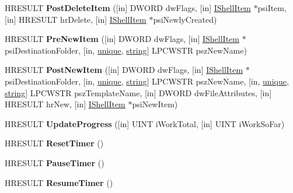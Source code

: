 \begin{DoxyCompactItemize}
\mbox{\label{interface_i_file_operation_progress_sink_a0ae276783b42d07e7987d2aa11f25bc9}} 
H\+R\+E\+S\+U\+LT {\bfseries Post\+Delete\+Item} (\mbox{[}in\mbox{]} D\+W\+O\+RD dw\+Flags, \mbox{[}in\mbox{]} \hyperlink{interface_i_shell_item}{I\+Shell\+Item} $\ast$psi\+Item, \mbox{[}in\mbox{]} H\+R\+E\+S\+U\+LT hr\+Delete, \mbox{[}in\mbox{]} \hyperlink{interface_i_shell_item}{I\+Shell\+Item} $\ast$psi\+Newly\+Created)
\item 
\mbox{\label{interface_i_file_operation_progress_sink_ac50b06e09f12c69331bfff394da7db4e}} 
H\+R\+E\+S\+U\+LT {\bfseries Pre\+New\+Item} (\mbox{[}in\mbox{]} D\+W\+O\+RD dw\+Flags, \mbox{[}in\mbox{]} \hyperlink{interface_i_shell_item}{I\+Shell\+Item} $\ast$psi\+Destination\+Folder, \mbox{[}in, \hyperlink{interfaceunique}{unique}, \hyperlink{structstring}{string}\mbox{]} L\+P\+C\+W\+S\+TR psz\+New\+Name)
\item 
\mbox{\label{interface_i_file_operation_progress_sink_a4076c61d7de4d307f5ce2b8b85dea361}} 
H\+R\+E\+S\+U\+LT {\bfseries Post\+New\+Item} (\mbox{[}in\mbox{]} D\+W\+O\+RD dw\+Flags, \mbox{[}in\mbox{]} \hyperlink{interface_i_shell_item}{I\+Shell\+Item} $\ast$psi\+Destination\+Folder, \mbox{[}in, \hyperlink{interfaceunique}{unique}, \hyperlink{structstring}{string}\mbox{]} L\+P\+C\+W\+S\+TR psz\+New\+Name, \mbox{[}in, \hyperlink{interfaceunique}{unique}, \hyperlink{structstring}{string}\mbox{]} L\+P\+C\+W\+S\+TR psz\+Template\+Name, \mbox{[}in\mbox{]} D\+W\+O\+RD dw\+File\+Attributes, \mbox{[}in\mbox{]} H\+R\+E\+S\+U\+LT hr\+New, \mbox{[}in\mbox{]} \hyperlink{interface_i_shell_item}{I\+Shell\+Item} $\ast$psi\+New\+Item)
\item 
\mbox{\label{interface_i_file_operation_progress_sink_a143a7788435cfb41f643473e5526f837}} 
H\+R\+E\+S\+U\+LT {\bfseries Update\+Progress} (\mbox{[}in\mbox{]} U\+I\+NT i\+Work\+Total, \mbox{[}in\mbox{]} U\+I\+NT i\+Work\+So\+Far)
\item 
\mbox{\label{interface_i_file_operation_progress_sink_ac8ddccf1deb0a660433209ae24dd2b5e}} 
H\+R\+E\+S\+U\+LT {\bfseries Reset\+Timer} ()
\item 
\mbox{\label{interface_i_file_operation_progress_sink_a97c2c5e5d8bfc360e882c00bbdea39bc}} 
H\+R\+E\+S\+U\+LT {\bfseries Pause\+Timer} ()
\item 
\mbox{\label{interface_i_file_operation_progress_sink_ac4d71371d8759d40b94c83f497f39fb5}} 
H\+R\+E\+S\+U\+LT {\bfseries Resume\+Timer} ()
\end{DoxyCompactItemize}
